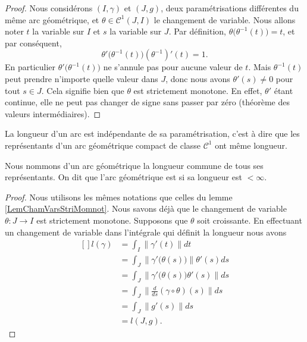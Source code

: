 \begin{proof}
    Nous considérons $(I,\gamma)$ et $(J,g)$, deux paramétrisations différentes du même arc géométrique, et $\theta\in \mathcal{C}^1(J,I)$ le changement de variable. Nous allons noter $t$ la variable sur $I$ et $s$ la variable sur $J$. Par définition, $\theta\big( \theta^{-1}(t) \big)=t$, et par conséquent,
    \begin{equation}
        \theta'\big( \theta^{-1}(t) \big)(\theta^{-1})'(t)=1.
    \end{equation}
    En particulier $\theta'\big( \theta^{-1}(t) \big)$ ne s'annule pas pour aucune valeur de $t$. Mais $\theta^{-1}(t)$ peut prendre n'importe quelle valeur dans $J$, donc nous avons $\theta'(s)\neq 0$ pour tout $s\in J$. Cela signifie bien que $\theta$ est strictement monotone. En effet, $\theta'$ étant continue, elle ne peut pas changer de signe sans passer par zéro (théorème des valeurs intermédiaires).
\end{proof}

\begin{theorem}     \label{ThoLongArcGeom}
    La longueur d'un arc est indépendante de sa paramétrisation, c'est à dire que les représentants d'un arc géométrique compact de classe $\mathcal{C}^1$ ont même longueur. 
\end{theorem}
Nous nommons  d'un arc géométrique la longueur commune de tous ses représentants. On dit que l'arc géométrique est  si sa longueur est $<\infty$.

\begin{proof}
    Nous utilisons les mêmes notations que celles du lemme \ref{LemChamVarsStriMomnot}. Nous savons déjà que le changement de variable $\theta \colon J\to I$ est strictement monotone. Supposons que $\theta$ soit croissante.
    En effectuant un changement de variable dans l'intégrale qui définit la longueur nous avons
    \begin{equation}
        \begin{aligned}[]
            l(\gamma)&=\int_I\| \gamma'(t) \|dt\\
                &=\int_J\| \gamma'\big( \theta(s) \big) \|\theta'(s)ds\\
                &=\int_J\| \gamma'\big( \theta(s) \big)\theta'(s) \|ds\\
                &=\int_J\| \frac{ d }{ ds }(\gamma\circ\theta)(s) \|ds\\
                &=\int_J\| g'(s) \|ds\\
                &=l(J,g).
        \end{aligned}
    \end{equation}
\end{proof}

